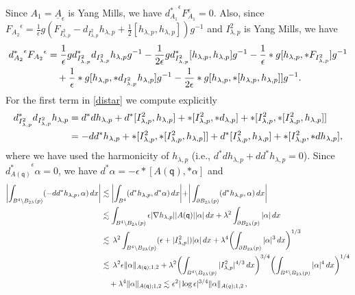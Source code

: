 \documentclass[11pt]{article}
\numberwithin{equation}{section} \setlength{\topmargin}{-35pt}
\newcommand{\q}{\mathsf{q}}
\begin{document}
\noindent Since $A_1=\underline{A}_{\epsilon}$ is Yang Mills, we
have ${d_{A_1}^{\ast}}^{\epsilon}F_{A_1}^{\epsilon}=0$. Also, since
${F_{A_2}}^{\epsilon}=\frac{1}{\epsilon}g(F_{I^2_{\lambda,p}}-d_{I^2_{\lambda,p}}h_{\lambda,p}+\frac{1}{2}[h_{\lambda,p},h_{\lambda,p}])g^{-1}$
and $I^2_{\lambda,p}$ is Yang Mills, we have
\begin{align}
\label{distar}
{d_{A_2}^{\ast}}^{\epsilon}{F_{A_2}}^{\epsilon}&=\frac{1}{\epsilon}gd_{I^2_{\lambda,p}}^{\ast}d_{I^2_{\lambda,p}}h_{\lambda,p}g^{-1}-
\frac{1}{2\epsilon}gd_{I^2_{\lambda,p}}^{\ast}[h_{\lambda,p},h_{\lambda,p}]g^{-1}-
\frac{1}{\epsilon}\ast g[h_{\lambda,p},\ast F_{I^2_{\lambda,p}}]g^{-1}\notag\\
 &\quad+\frac{1}{\epsilon}\ast g[h_{\lambda,p},\ast d_{I^2_{\lambda,p}}h_{\lambda,p}]g^{-1}-
 \frac{1}{2\epsilon}\ast g[h_{\lambda,p},\ast[h_{\lambda,p},h_{\lambda,p}]]g^{-1}.
\end{align}
For the first term in \eqref{distar} we compute explicitly
\begin{align}
\label{ft}
d_{I^2_{\lambda,p}}^{\ast}d_{I^2_{\lambda,p}}h_{\lambda,p}&=d^{\ast}dh_{\lambda,p}+d^{\ast}[I^2_{\lambda,p},h_{\lambda,p}]+
\ast[I^2_{\lambda,p},\ast d_{\lambda,p}]+\ast[I^2_{\lambda,p},\ast[I^2_{\lambda,p},h_{\lambda,p}]]\notag\\
 &=-dd^{\ast}h_{\lambda,p}+\ast[I^2_{\lambda,p},\ast[I^2_{\lambda,p},h_{\lambda,p}]]+
d^{\ast}[I^2_{\lambda,p},h_{\lambda,p}]+\ast[I^2_{\lambda,p},\ast
dh_{\lambda,p}],
\end{align}
where we have used the harmonicity of $h_{\lambda,p}$ (i.e.,
$d^{\ast}dh_{\lambda,p}+dd^{\ast}h_{\lambda,p}=0$). Since
${d_{A(\q)}^{\ast}}^{\epsilon}\alpha=0$, we have
$d^{\ast}\alpha=-\epsilon\ast[A(\q),\ast\alpha]$ and
\begin{align}
\label{begin} \biggl|\int_{B^4\setminus
B_{2\lambda}(p)}(-dd^{\ast}h_{\lambda,p},\alpha)\,dx\biggr|
&\lesssim\biggl|\int_{B^4}(d^{\ast}h_{\lambda,p},d^{\ast}\alpha)\,dx
\biggr|+
\biggr|\int_{\partial B_{2\lambda}(p)}(d^{\ast}h_{\lambda,p},\alpha)\,dx\biggr|\notag\\
&\lesssim\int_{B^4\setminus B_{2\lambda}(p)}\epsilon|\nabla
h_{\lambda,p}||A(\q)||\alpha|\,dx+
\lambda^2\int_{\partial B_{2\lambda}(p)}|\alpha|\,dx\notag\\
&\lesssim\,\lambda^2\int_{B^4\setminus
B_{2\lambda}(p)}(\epsilon+|I^2_{\lambda,p}|)|\alpha|\,dx+
\lambda^4\biggl(\int_{\partial B_{2\lambda}(p)}|\alpha|^3\,dx\biggr)^{1/3}\notag\\
&\lesssim\,\lambda^2\epsilon\|\alpha\|_{A(\q);1,2}+
\lambda^2\biggl(\int_{B^4\setminus
B_{2\lambda}(p)}|I^2_{\lambda,p}|^{4/3}\,dx\biggr)^{3/4}
\biggl(\int_{B^4\setminus B_{2\lambda}(p)}|\alpha|^4\,dx\biggr)^{1/4}\notag\\
&\quad+\lambda^4\|\alpha\|_{A(\q);1,2}\lesssim\epsilon^2|\log\epsilon|^{3/4}\|\alpha\|_{A(q);1,2}\,,
\end{align}
\end{document}
